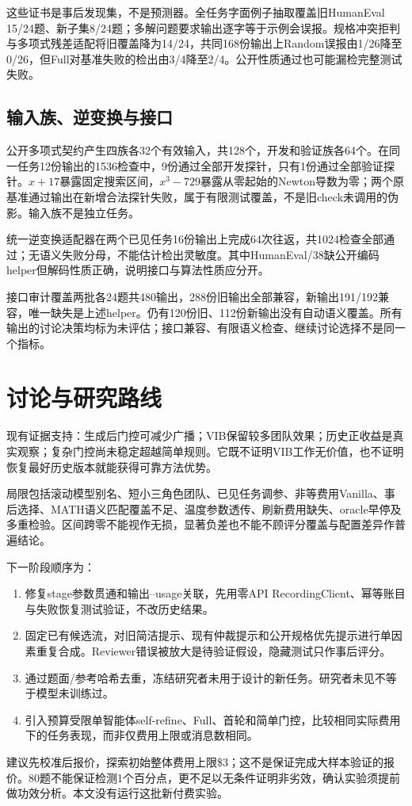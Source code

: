 \documentclass[11pt,a4paper]{article}
\begin{document}
这些证书是事后发现集，不是预测器。全任务字面例子抽取覆盖旧HumanEval 15/24题、新子集8/24题；多解问题要求输出逐字等于示例会误报。规格冲突拒判与多项式残差适配将旧覆盖降为14/24，共同168份输出上Random误报由1/26降至0/26，但Full对基准失败的检出由3/4降至2/4。公开性质通过也可能漏检完整测试失败。

\subsection{输入族、逆变换与接口}
公开多项式契约产生四族各32个有效输入，共128个，开发和验证族各64个。在同一任务12份输出的1536检查中，9份通过全部开发探针，只有1份通过全部验证探针。$x+17$暴露固定搜索区间，$x^3-729$暴露从零起始的Newton导数为零；两个原基准通过输出在新增合法探针失败，属于有限测试覆盖，不是旧check未调用的伪影。输入族不是独立任务。

统一逆变换适配器在两个已见任务16份输出上完成64次往返，共1024检查全部通过；无语义失败分母，不能估计检出灵敏度。其中HumanEval/38缺公开编码helper但解码性质正确，说明接口与算法性质应分开。

接口审计覆盖两批各24题共480输出，288份旧输出全部兼容，新输出191/192兼容，唯一缺失是上述helper。仍有120份旧、112份新输出没有自动语义覆盖。所有输出的讨论决策均标为未评估；接口兼容、有限语义检查、继续讨论选择不是同一个指标。

\section{讨论与研究路线}
现有证据支持：生成后门控可减少广播；VIB保留较多团队效果；历史正收益是真实观察；复杂门控尚未稳定超越简单规则。它既不证明VIB工作无价值，也不证明恢复最好历史版本就能获得可靠方法优势。

局限包括滚动模型别名、短小三角色团队、已见任务调参、非等费用Vanilla、事后选择、MATH语义匹配覆盖不足、温度参数透传、刷新费用缺失、oracle早停及多重检验。区间跨零不能视作无损，显著负差也不能不顾评分覆盖与配置差异作普遍结论。

下一阶段顺序为：
\begin{enumerate}
\item 修复stage参数贯通和输出--usage关联，先用零API RecordingClient、幂等账目与失败恢复测试验证，不改历史结果。
\item 固定已有候选流，对旧简洁提示、现有仲裁提示和公开规格优先提示进行单因素重复合成。Reviewer错误被放大是待验证假设，隐藏测试只作事后评分。
\item 通过题面/参考哈希去重，冻结研究者未用于设计的新任务。研究者未见不等于模型未训练过。
\item 引入预算受限单智能体self-refine、Full、首轮和简单门控，比较相同实际费用下的任务表现，而非仅费用上限或消息数相同。
\end{enumerate}
建议先校准后报价，探索初始整体费用上限\$3；这不是保证完成大样本验证的报价。80题不能保证检测1个百分点，更不足以无条件证明非劣效，确认实验须提前做功效分析。本文没有运行这批新付费实验。
\end{document}
